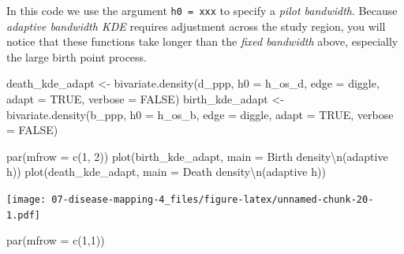 \documentclass[
]{book}
\newenvironment{Shaded}{\begin{snugshade}}{\end{snugshade}}
\newcommand{\AttributeTok}[1]{\textcolor[rgb]{0.77,0.63,0.00}{#1}}
\newcommand{\ConstantTok}[1]{\textcolor[rgb]{0.00,0.00,0.00}{#1}}
\newcommand{\DecValTok}[1]{\textcolor[rgb]{0.00,0.00,0.81}{#1}}
\newcommand{\FunctionTok}[1]{\textcolor[rgb]{0.00,0.00,0.00}{#1}}
\newcommand{\NormalTok}[1]{#1}
\newcommand{\OtherTok}[1]{\textcolor[rgb]{0.56,0.35,0.01}{#1}}
\newcommand{\SpecialCharTok}[1]{\textcolor[rgb]{0.00,0.00,0.00}{#1}}
\newcommand{\StringTok}[1]{\textcolor[rgb]{0.31,0.60,0.02}{#1}}
\begin{document}
In this code we use the argument \texttt{h0\ =\ xxx} to specify a \emph{pilot bandwidth}. Because \emph{adaptive bandwidth KDE} requires adjustment across the study region, you will notice that these functions take longer than the \emph{fixed bandwidth} above, especially the large birth point process.

\begin{Shaded}
\begin{Highlighting}[]
\NormalTok{death\_kde\_adapt }\OtherTok{\textless{}{-}} \FunctionTok{bivariate.density}\NormalTok{(d\_ppp, }
                                     \AttributeTok{h0 =}\NormalTok{ h\_os\_d, }
                                     \AttributeTok{edge =} \StringTok{\textquotesingle{}diggle\textquotesingle{}}\NormalTok{, }
                                     \AttributeTok{adapt =} \ConstantTok{TRUE}\NormalTok{,}
                                     \AttributeTok{verbose =} \ConstantTok{FALSE}\NormalTok{)}
\NormalTok{birth\_kde\_adapt }\OtherTok{\textless{}{-}} \FunctionTok{bivariate.density}\NormalTok{(b\_ppp, }
                                     \AttributeTok{h0 =}\NormalTok{ h\_os\_b, }
                                     \AttributeTok{edge =} \StringTok{\textquotesingle{}diggle\textquotesingle{}}\NormalTok{,}
                                     \AttributeTok{adapt =} \ConstantTok{TRUE}\NormalTok{,}
                                     \AttributeTok{verbose =} \ConstantTok{FALSE}\NormalTok{)}
\end{Highlighting}
\end{Shaded}

\begin{Shaded}
\begin{Highlighting}[]
\FunctionTok{par}\NormalTok{(}\AttributeTok{mfrow =} \FunctionTok{c}\NormalTok{(}\DecValTok{1}\NormalTok{, }\DecValTok{2}\NormalTok{))}
\FunctionTok{plot}\NormalTok{(birth\_kde\_adapt, }\AttributeTok{main =} \StringTok{\textquotesingle{}Birth density}\SpecialCharTok{\textbackslash{}n}\StringTok{(adaptive h)\textquotesingle{}}\NormalTok{)}
\FunctionTok{plot}\NormalTok{(death\_kde\_adapt, }\AttributeTok{main =} \StringTok{\textquotesingle{}Death density}\SpecialCharTok{\textbackslash{}n}\StringTok{(adaptive h)\textquotesingle{}}\NormalTok{)}
\end{Highlighting}
\end{Shaded}

\texttt{[image: 07-disease-mapping-4\_files/figure-latex/unnamed-chunk-20-1.pdf]}

\begin{Shaded}
\begin{Highlighting}[]
\FunctionTok{par}\NormalTok{(}\AttributeTok{mfrow =} \FunctionTok{c}\NormalTok{(}\DecValTok{1}\NormalTok{,}\DecValTok{1}\NormalTok{))}
\end{Highlighting}
\end{Shaded}
\end{document}
